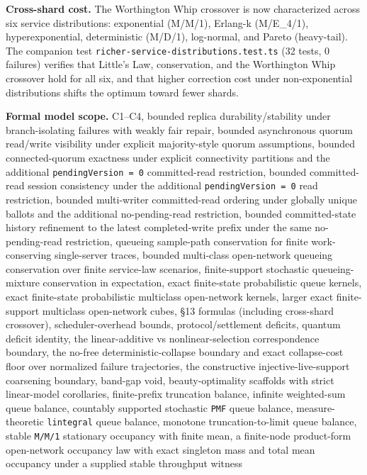 \documentclass[
  11pt,
]{article}
\begin{document}
\textbf{Cross-shard cost.} The Worthington Whip crossover is now
characterized across six service distributions: exponential (M/M/1),
Erlang-k (M/E\_4/1), hyperexponential, deterministic (M/D/1),
log-normal, and Pareto (heavy-tail). The companion test
\texttt{richer-service-distributions.test.ts} (32 tests, 0 failures)
verifies that Little's Law, conservation, and the Worthington Whip
crossover hold for all six, and that higher correction cost under
non-exponential distributions shifts the optimum toward fewer shards.

\textbf{Formal model scope.} C1--C4, bounded replica
durability/stability under branch-isolating failures with weakly fair
repair, bounded asynchronous quorum read/write visibility under explicit
majority-style quorum assumptions, bounded connected-quorum exactness
under explicit connectivity partitions and the additional
\texttt{pendingVersion\ =\ 0} committed-read restriction, bounded
committed-read session consistency under the additional
\texttt{pendingVersion\ =\ 0} read restriction, bounded multi-writer
committed-read ordering under globally unique ballots and the additional
no-pending-read restriction, bounded committed-state history refinement
to the latest completed-write prefix under the same no-pending-read
restriction, queueing sample-path conservation for finite
work-conserving single-server traces, bounded multi-class open-network
queueing conservation over finite service-law scenarios, finite-support
stochastic queueing-mixture conservation in expectation, exact
finite-state probabilistic queue kernels, exact finite-state
probabilistic multiclass open-network kernels, larger exact
finite-support multiclass open-network cubes, §13 formulas (including
cross-shard crossover), scheduler-overhead bounds, protocol/settlement
deficits, quantum deficit identity, the linear-additive vs
nonlinear-selection correspondence boundary, the no-free
deterministic-collapse boundary and exact collapse-cost floor over
normalized failure trajectories, the constructive injective-live-support
coarsening boundary, band-gap void, beauty-optimality scaffolds with
strict linear-model corollaries, finite-prefix truncation balance,
infinite weighted-sum queue balance, countably supported stochastic
\texttt{PMF} queue balance, measure-theoretic \texttt{lintegral} queue
balance, monotone truncation-to-limit queue balance, stable
\texttt{M/M/1} stationary occupancy with finite mean, a finite-node
product-form open-network occupancy law with exact singleton mass and
total mean occupancy under a supplied stable throughput witness
\end{document}
